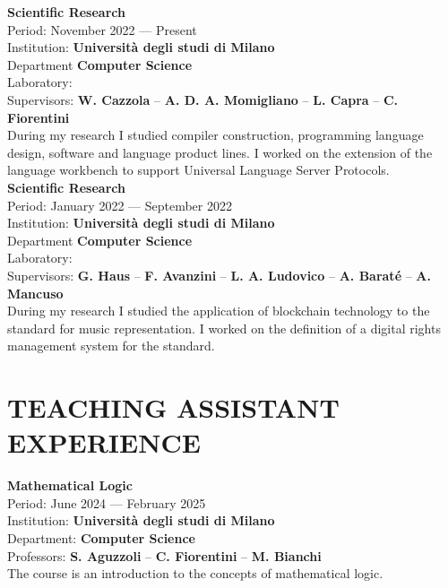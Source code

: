 \documentclass[a4paper,9pt]{extarticle}
\begin{document}
\noindent
\newline
\textbf{Scientific Research} \\
Period: November 2022 --- Present \\
Institution: \textbf{Universit\`a degli studi di Milano} \\
Department \textbf{Computer Science} \\
Laboratory: \textbf{\adaptlab} \\
Supervisors: \textbf{W. Cazzola} -- \textbf{A. D. A. Momigliano} -- \textbf{L. Capra} -- \textbf{C. Fiorentini} \\
During my research I studied compiler construction, programming language design, software and language product lines. I worked on the extension of the \neverlang language workbench to support Universal Language Server Protocols. \\

\noindent
\textbf{Scientific Research} \\
Period: January 2022 --- September 2022 \\
Institution: \textbf{Universit\`a degli studi di Milano} \\
Department \textbf{Computer Science} \\
Laboratory: \textbf{\limlab} \\
Supervisors: \textbf{G. Haus} -- \textbf{F. Avanzini} -- \textbf{L. A. Ludovico} -- \textbf{A. Barat\'e} -- \textbf{A. Mancuso} \\
During my research I studied the application of blockchain technology to the \ieeeofnn standard for music representation. I worked on the definition of a digital rights management system for the standard. \\


\section*{TEACHING ASSISTANT EXPERIENCE}

\noindent
\newline
\textbf{Mathematical Logic} \\
Period: June 2024 --- February 2025 \\
Institution: \textbf{Universit\`a degli studi di Milano} \\
Department: \textbf{Computer Science} \\
Professors: \textbf{S. Aguzzoli} -- \textbf{C. Fiorentini} -- \textbf{M. Bianchi} \\
The course is an introduction to the concepts of mathematical logic. \\
\end{document}
